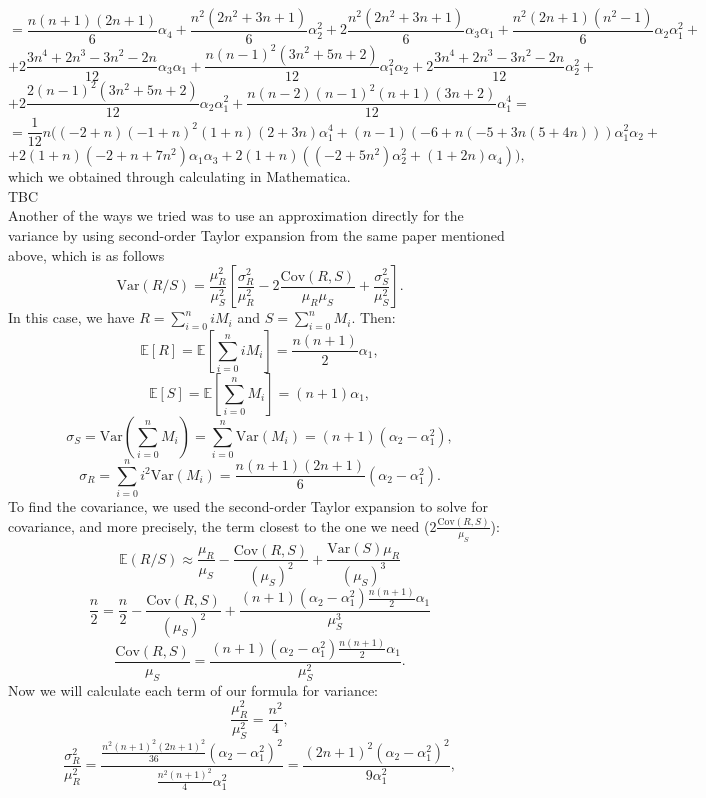\documentclass[11pt, twoside, reqno]{book}
\newcommand{\Var}{\text{Var}}
\newcommand{\Cov}{\text{Cov}}
\begin{document}
$$=\frac{n(n+1)(2n+1)}{6} \alpha_{4} + \frac{n^{2}(2n^{2}+3n+1)}{6} \alpha_{2}^{2} + 2\frac{n^{2}(2n^{2}+3n+1)}{6}\alpha_{3}\alpha_{1} + \frac{n^{2}(2n+1)(n^{2}-1)}{6}\alpha_{2}\alpha_{1}^{2} + $$
$$+2\frac{3n^{4}+2n^{3}-3n^{2}-2n}{12}\alpha_{3}\alpha_{1} + \frac{n(n-1)^{2}(3n^{2}+5n+2)}{12}\alpha_{1}^{2}\alpha_{2} + 2\frac{3n^{4}+2n^{3}-3n^{2}-2n}{12}\alpha_{2}^{2} + $$
$$+2\frac{2(n-1)^{2}(3n^2+5n+2)}{12}\alpha_{2}\alpha_{1}^{2}+\frac{n(n-2)(n-1)^{2}(n+1)(3n+2)}{12}\alpha_{1}^{4} =$$
$$=\frac{1}{12} n((-2 + n) (-1 + n)^2 (1 + n) (2 + 3 n) \alpha_{1}^{4} + (n-1) (-6 + n(-5 + 3 n (5 + 4 n))) \alpha_{1}^{2} \alpha_{2} + $$
$$+2 (1 + n) (-2 + n + 7 n^2) \alpha_{1}\alpha_{3}+2 (1 + n) ((-2 + 5 n^2) 
\alpha_{2}^{2} + (1 + 2 n) \alpha_{4})),$$
which we obtained through calculating in Mathematica. \\
TBC \\
Another of the ways we tried was to use an approximation directly for the variance by using second-order Taylor expansion from the same paper mentioned above, which is as follows
$$\Var(R/S) = \frac{\mu_{R}^{2}}{\mu_{S}^{2}}\left[ \frac{\sigma_{R}^{2}}{\mu_{R}^{2}} - 2 \frac{\Cov(R, S)}{\mu_{R}\mu_{S}}+ \frac{\sigma^{2}_{S}}{\mu_{S}^{2}}\right].$$
In this case, we have $R = \sum^{n}_{i=0} iM_{i}$ and $S = \sum^{n}_{i=0}M_{i}$. Then:
$$\mathbb{E}[R] = \mathbb{E}\left[\sum^{n}_{i=0}iM_{i} \right]= \frac{n(n+1)}{2}\alpha_{1},$$
$$\mathbb{E}[S] = \mathbb{E}\left[\sum^{n}_{i=0}M_{i}\right] = (n+1)\alpha_{1},$$
$$\sigma_{S} = \Var\left(\sum^{n}_{i=0}M_{i}\right) = \sum^{n}_{i=0}\Var(M_{i})=(n+1)(\alpha_{2}-\alpha^{2}_{1}),$$
$$\sigma_{R} = \sum^{n}_{i=0} i^{2} \Var(M_{i})=\frac{n(n+1)(2n+1)}{6}(\alpha_{2}-\alpha^{2}_{1}).$$
To find the covariance, we used the second-order Taylor expansion to solve for covariance, and more precisely, the term closest to the one we need ($2 \frac{\Cov(R, S)}{\mu_{S}}$):
$$\mathbb{E}(R/S) \approx \frac{\mu_{R}}{\mu_{S}} - \frac{\Cov(R, S)}{(\mu_{S})^2}+\frac{\Var(S)\mu_{R}}{(\mu_{S})^{3}}$$
$$\frac{n}{2} = \frac{n}{2} - \frac{\Cov(R,S)}{(\mu_{S})^2} + \frac{(n+1)(\alpha_{2}-\alpha^{2}_{1})\frac{n(n+1)}{2}\alpha_{1}}{\mu_{S}^{3}}$$
$$\frac{\Cov(R,S)}{\mu_{S}} =  \frac{(n+1)(\alpha_{2}-\alpha^{2}_{1})\frac{n(n+1)}{2}\alpha_{1}}{\mu_{S}^{2}}.$$
Now we will calculate each term of our formula for variance:
$$\frac{\mu_{R}^{2}}{\mu_{S}^{2}}= \frac{ n^{2}}{4},$$
$$\frac{\sigma_{R}^{2}}{\mu_{R}^{2}}=\frac{\frac{n^{2}(n+1)^{2}(2n+1)^{2}}{36}(\alpha_{2}-\alpha^{2}_{1})^{2}}{\frac{n^{2}(n+1)^{2}}{4}\alpha^{2}_{1}}=\frac{(2n+1)^{2}(\alpha_{2}-\alpha^{2}_{1})^{2}}{9\alpha^{2}_{1}},$$
\end{document}
